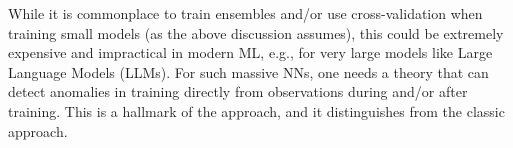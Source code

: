 While it is commonplace to train ensembles and/or use cross-validation when training small models (as the above discussion assumes),
this could be extremely expensive and impractical in modern ML, e.g., for very large models like Large Language Models (LLMs).
For such massive NNs, one needs a theory that can detect anomalies in training directly from observations during and/or after training.
This is a hallmark of the \SETOL approach, and it distinguishes \SETOL from the classic \STATMECH approach.



